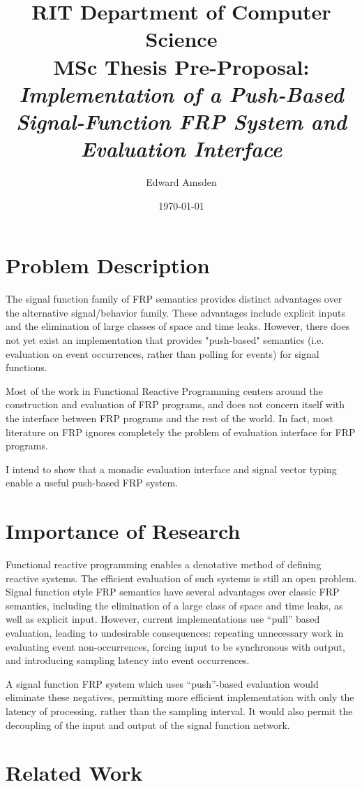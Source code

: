 \documentclass[11pt]{artikel3}
\title{RIT Department of Computer Science\\MSc Thesis Pre-Proposal:\\\emph{Implementation of a Push-Based Signal-Function FRP System and Evaluation Interface}}
\author{Edward Amsden}
\date{\today}
\begin{document}
\maketitle

\section{Problem Description}
The signal function family of FRP semantics provides distinct advantages over the alternative signal/behavior family. These advantages include explicit inputs and the elimination of large classes of space and time leaks. However, there does not yet exist an implementation that provides "push-based" semantics (i.e. evaluation on event occurrences, rather than polling for events) for signal functions. 

Most of the work in Functional Reactive Programming centers around the construction and evaluation of FRP programs, and does not concern itself with the interface between FRP programs and the rest of the world. In fact, most literature on FRP ignores completely the problem of evaluation interface for FRP programs. 

I intend to show that a monadic evaluation interface and signal vector typing enable a useful push-based FRP system.

\section{Importance of Research}
Functional reactive programming enables a denotative method of defining reactive systems. The efficient evaluation
of such systems is still an open problem. Signal function style FRP semantics have several advantages over
classic FRP semantics, including the elimination of a large class of space and time leaks, as well as explicit input. However,
current implementations use ``pull'' based evaluation, leading to undesirable consequences:
repeating unnecessary work in evaluating event non-occurrences, forcing input to be synchronous with output, and introducing sampling latency into event occurrences.

A signal function FRP system which uses ``push''-based evaluation would eliminate these negatives, permitting more
efficient implementation with only the latency of processing, rather than the sampling interval. It would also permit
the decoupling of the input and output of the signal function network.

\section{Related Work}
\end{document}
